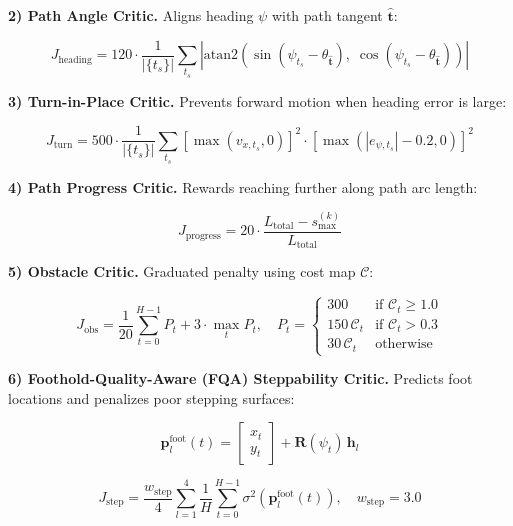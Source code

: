 \documentclass[11pt,a4paper]{article}
\begin{document}
\textbf{2) Path Angle Critic.} Aligns heading $\psi$ with path tangent $\hat{\mathbf{t}}$:

\begin{equation}
J_{\text{heading}} = 120 \cdot \frac{1}{|\{t_s\}|}\sum_{t_s} \left|\text{atan2}\!\left(\sin(\psi_{t_s} - \theta_{\hat{\mathbf{t}}}),\; \cos(\psi_{t_s} - \theta_{\hat{\mathbf{t}}})\right)\right|
\end{equation}

\textbf{3) Turn-in-Place Critic.} Prevents forward motion when heading error is large:

\begin{equation}
J_{\text{turn}} = 500 \cdot \frac{1}{|\{t_s\}|}\sum_{t_s} \left[\max(v_{x,t_s}, 0)\right]^2 \cdot \left[\max(|e_{\psi,t_s}| - 0.2, 0)\right]^2
\end{equation}

\textbf{4) Path Progress Critic.} Rewards reaching further along path arc length:

\begin{equation}
J_{\text{progress}} = 20 \cdot \frac{L_{\text{total}} - s_{\max}^{(k)}}{L_{\text{total}}}
\end{equation}

\textbf{5) Obstacle Critic.} Graduated penalty using cost map $\mathcal{C}$:

\begin{equation}
J_{\text{obs}} = \frac{1}{20}\sum_{t=0}^{H-1} P_t + 3 \cdot \max_t P_t, \quad P_t = \begin{cases} 300 & \text{if } \mathcal{C}_t \geq 1.0 \\ 150\,\mathcal{C}_t & \text{if } \mathcal{C}_t > 0.3 \\ 30\,\mathcal{C}_t & \text{otherwise} \end{cases}
\end{equation}

\textbf{6) Foothold-Quality-Aware (FQA) Steppability Critic.} Predicts foot locations and penalizes poor stepping surfaces:

\begin{equation}
\mathbf{p}_l^{\text{foot}}(t) = \begin{bmatrix} x_t \\ y_t \end{bmatrix} + \mathbf{R}(\psi_t)\,\mathbf{h}_l
\end{equation}

\begin{equation}
J_{\text{step}} = \frac{w_{\text{step}}}{4} \sum_{l=1}^{4} \frac{1}{H}\sum_{t=0}^{H-1} \sigma^2(\mathbf{p}_l^{\text{foot}}(t)), \quad w_{\text{step}} = 3.0
\end{equation}
\end{document}
